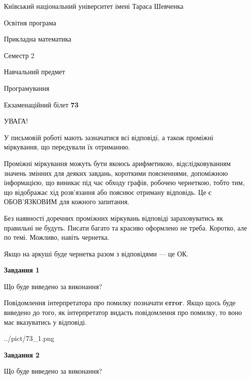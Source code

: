 \documentclass[12pt, ukrainian]{article}
\begin{document}
{{\begin {small}\par
{ \center  Київський національний університет імені Тараса Шевченка \par}
{\parbox {5 cm}{Освітня програма \hfill}{\parbox {7 cm}{Прикладна математика \hfill}}\parbox {6 cm}{\hfill Семестр 2}}\par
{\parbox {5 cm} {Навчальний предмет \hfill}\parbox {7 cm}{Програмування \hfill}\parbox {6cm}{\hfill}\par}\vspace{-7pt} \end{small}}{\center Екзаменаційний білет \No \textbf
{ 73 }\par}}
{
\begin {large}
УВАГА!

У письмовій роботі мають зазначатися всі відповіді, а також проміжні міркування, що передували їх отриманню.

Проміжні міркування можуть бути якоюсь арифметикою, відслідковуванням зна\-чень змінних для деяких завдань,
короткими поясненнями, допоміжною інформацією, що виникає під час обходу графів, робочею чернеткою,
тобто тим, що відображає хід розв’язання або пояснює отриману відповідь.
Це є ОБОВ’ЯЗКОВИМ для кожного запитання.

Без наявності доречних проміжних міркувань відповіді зараховуватись як правиль\-ні не будуть.
Писати багато та красиво оформлено не треба. Коротко, але по темі. Можли\-во, навіть чернетка.

Якщо на аркуші буде чернетка разом з відповідями --- це ОК.

\newpage

{\begin {center}\textbf{Завдання 1}\end {center}}\par
Що буде виведено за виконання?

Повідомлення інтерпретатора про помилку позначати \textbf{error}.
Якщо щось буде виведено до того, як інтерпретатор видасть повідомлення про помилку, 
то воно має вказуватись у відповіді. \par


\begin{center}
	{../pict/73_1.png}
\end{center}
\newpage

{\begin {center}\textbf{Завдання 2}\end {center}}\par
Що буде виведено за виконання?


\end{large}}
\end{document}

